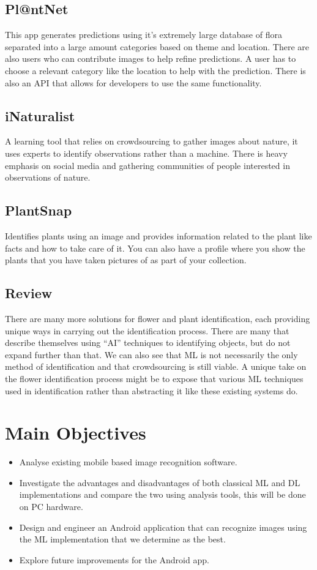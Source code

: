 \documentclass{article}
\begin{document}
\subsection{Pl@ntNet}
This app generates predictions using it’s extremely large database of flora separated into a large amount categories based on theme and location. There are also users who can contribute images to help refine predictions. A user has to choose a relevant category like the location to help with the prediction. There is also an API that allows for developers to use the same functionality.
\subsection{iNaturalist}
A learning tool that relies on crowdsourcing to gather images about nature, it uses experts to identify observations rather than a machine. There is heavy emphasis on social media and gathering communities of people interested in observations of nature.
\subsection{PlantSnap}
Identifies plants using an image and provides information related to the plant like facts and how to take care of it. You can also have a profile where you show the plants that you have taken pictures of as part of your collection. 
\subsection{Review}
There are many more solutions for flower and plant identification, each providing unique ways in carrying out the identification process. There are many that describe themselves using “AI” techniques to identifying objects, but do not expand further than that. We can also see that ML is not necessarily the only method of identification and that crowdsourcing is still viable. A unique take on the flower identification process might be to expose that various ML techniques used in identification rather than abstracting it like these existing systems do.
\section{Main Objectives}
\begin{itemize}
    \item Analyse existing mobile based image recognition software.
    \item Investigate the advantages and disadvantages of both classical ML and DL implementations and compare the two using analysis tools, this will be done on PC hardware.
    \item Design and engineer an Android application that can recognize images using the ML implementation that we determine as the best.
    \item Explore future improvements for the Android app.
\end{itemize}
\end{document}
